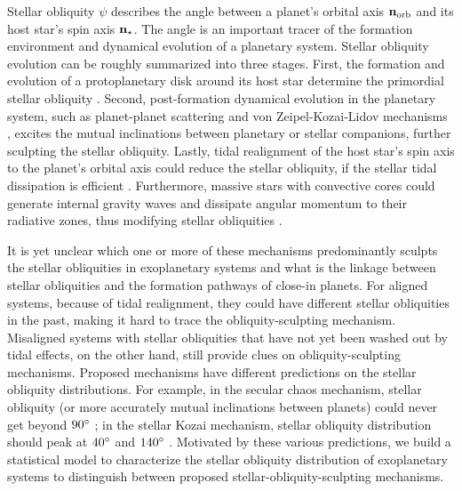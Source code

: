 \documentclass[twocolumn,times]{aastex631}
\begin{document}
Stellar obliquity $\psi$ describes the angle between a planet's orbital axis $\bf{n}_{\rm orb}$ and its host star's spin axis $\bf{n}_{\star}$. 
The angle is an important tracer of the formation environment and dynamical evolution of a planetary system. Stellar obliquity evolution can be roughly summarized into three stages. First, the formation and evolution of a protoplanetary disk around its host star determine the primordial stellar obliquity \citep[e.g.,][]{Bate10, Lai11, Batygin12}. Second, post-formation dynamical evolution in the planetary system, such as planet-planet scattering \citep[e.g.,][]{Rasio96, Chatterjee08, Nagasawa08, Beague12} and von Zeipel-Kozai-Lidov mechanisms \citep[e.g.,][]{Wu03, Naoz16}, excites the mutual inclinations between planetary or stellar companions, further sculpting the stellar obliquity. Lastly, tidal realignment of the host star's spin axis to the planet's orbital axis could reduce the stellar obliquity, if the stellar tidal dissipation is efficient \citep[e.g.,][]{Winn10, Albrecht12}. Furthermore, massive stars with convective cores could generate internal gravity waves and dissipate angular momentum to their radiative zones, thus modifying stellar obliquities \citep{Rogers12, Rogers13}.

It is yet unclear which one or more of these mechanisms predominantly sculpts the stellar obliquities in exoplanetary systems and what is the linkage between stellar obliquities and the formation pathways of close-in planets.
For aligned systems, because of tidal realignment, they could have different stellar obliquities in the past, making it hard to trace the obliquity-sculpting mechanism.
Misaligned systems with stellar obliquities that have not yet been washed out by tidal effects, on the other hand, still provide clues on obliquity-sculpting mechanisms.
Proposed mechanisms have different predictions on the stellar obliquity distributions. For example, in the secular chaos mechanism, stellar obliquity (or more accurately mutual inclinations between planets) could never get beyond $90\mbox{$^\circ$}$ \citep{Teyssandier19}; in the stellar Kozai mechanism, stellar obliquity distribution should peak at $40\mbox{$^\circ$}$ and $140\mbox{$^\circ$}$ \citep{Anderson16}.
Motivated by these various predictions, we build a statistical model to characterize the stellar obliquity distribution of exoplanetary systems to distinguish between proposed stellar-obliquity-sculpting mechanisms.
\end{document}
